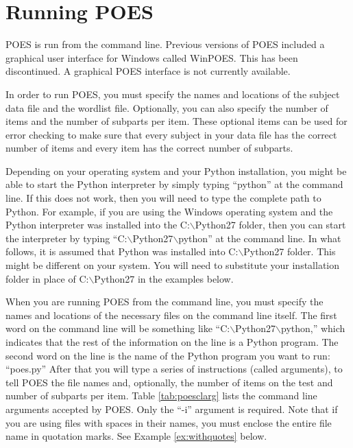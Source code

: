 \documentclass[11pt]{article}
\newcommand{\bsl}{$\backslash$}
\numberwithin{figure}{section}
\numberwithin{table}{section}
\begin{document}
\section{Running POES}
\label{sec:runpoes}
POES is run from the command line.  Previous versions of POES included a graphical user interface for Windows called WinPOES.  This has been discontinued. A graphical POES interface is not currently available.
 
In order to run POES, you must specify the names and locations of the subject data file and the wordlist file.  Optionally, you can also specify the number of items and the number of subparts per item.  These optional items can be used for error checking to make sure that every subject in your data file has the correct number of items and every item has the correct number of subparts.

Depending on your operating system and your Python installation, you might be able to start the Python interpreter by simply typing ``python'' at the command line.  If this does not work, then you will need to type the complete path to Python.  For example, if you are using the Windows operating system and the Python interpreter was installed into the C:\bsl{}Python27 folder, then you can start the interpreter by typing ``C:\bsl{}Python27\bsl{}python'' at the command line.  In what follows, it is assumed that Python was installed into C:\bsl{}Python27 folder.  This might be different on your system.  You will need to substitute your installation folder in place of C:\bsl{}Python27 in the examples below.

When you are running POES from the command line, you must specify the names and locations of the necessary files on the command line itself.  The first word on the command line will be something like ``C:\bsl{}Python27\bsl{}python,'' which indicates that the rest of the information on the line is a Python program.  The second word on the line is  the name of the Python program you want to run: ``poes.py''  After that you will type a series of instructions (called arguments), to tell POES the file names and, optionally, the number of items on the test and number of subparts per item.  Table \ref{tab:poesclarg} lists the command line arguments accepted by POES.  Only the ``-i'' argument is required.  Note that if you are using files with spaces in their names, you must enclose the entire file name in quotation marks.  See Example \ref{ex:withquotes} below.
\end{document}
